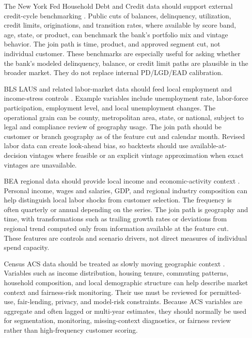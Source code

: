 \documentclass[11pt]{article}
\newcommand{\1}{\mathbf{1}}
\begin{document}
The New York Fed Household Debt and Credit data should support external
credit-cycle benchmarking \citep{nyfedHhdc}. Public cuts of balances,
delinquency, utilization, credit limits, originations, and transition rates,
where available by score band, age, state, or product, can benchmark the
bank's portfolio mix and vintage behavior. The join path is time, product, and
approved segment cut, not individual customer. These benchmarks are especially
useful for asking whether the bank's modeled delinquency, balance, or credit
limit paths are plausible in the broader market. They do not replace internal
PD/LGD/EAD calibration.

BLS LAUS and related labor-market data should feed local employment and
income-stress controls \citep{blsLAUS}. Example variables include unemployment
rate, labor-force participation, employment level, and local unemployment
changes. The operational grain can be county, metropolitan area, state, or
national, subject to legal and compliance review of geography usage. The join
path should be customer or branch geography as of the feature cut and calendar
month. Revised labor data can create look-ahead bias, so backtests should use
available-at-decision vintages where feasible or an explicit vintage
approximation when exact vintages are unavailable.

BEA regional data should provide local income and economic-activity context
\citep{beaRegional}. Personal income, wages and salaries, GDP, and regional
industry composition can help distinguish local labor shocks from customer
selection. The frequency is often quarterly or annual depending on the series.
The join path is geography and time, with transformations such as trailing
growth rates or deviations from regional trend computed only from information
available at the feature cut. These features are controls and scenario
drivers, not direct measures of individual spend capacity.

Census ACS data should be treated as slowly moving geographic context
\citep{censusACS}. Variables such as income distribution, housing tenure,
commuting patterns, household composition, and local demographic structure can
help describe market context and fairness-risk monitoring. Their use must be
reviewed for permitted-use, fair-lending, privacy, and model-risk constraints.
Because ACS variables are aggregate and often lagged or multi-year estimates,
they should normally be used for segmentation, monitoring, missing-context
diagnostics, or fairness review rather than high-frequency customer scoring.
\end{document}
